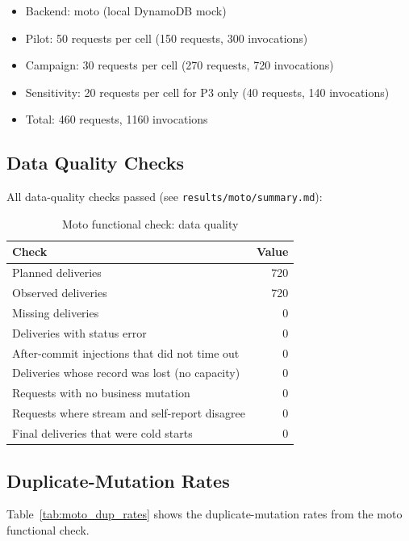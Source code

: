 \begin{itemize}
    \item Backend: moto (local DynamoDB mock)
    \item Pilot: 50 requests per cell (150 requests, 300 invocations)
    \item Campaign: 30 requests per cell (270 requests, 720 invocations)
    \item Sensitivity: 20 requests per cell for P3 only (40 requests, 140 invocations)
    \item Total: 460 requests, 1160 invocations
\end{itemize}

\subsection{Data Quality Checks}

All data-quality checks passed (see \texttt{results/moto/summary.md}):

\begin{table}[h]
\centering
\caption{Moto functional check: data quality}
\begin{tabular}{lr}
\hline
\textbf{Check} & \textbf{Value} \\
\hline
Planned deliveries & 720 \\
Observed deliveries & 720 \\
Missing deliveries & 0 \\
Deliveries with status error & 0 \\
After-commit injections that did not time out & 0 \\
Deliveries whose record was lost (no capacity) & 0 \\
Requests with no business mutation & 0 \\
Requests where stream and self-report disagree & 0 \\
Final deliveries that were cold starts & 0 \\
\hline
\end{tabular}
\end{table}

\subsection{Duplicate-Mutation Rates}

Table~\ref{tab:moto_dup_rates} shows the duplicate-mutation rates from the moto functional check.

